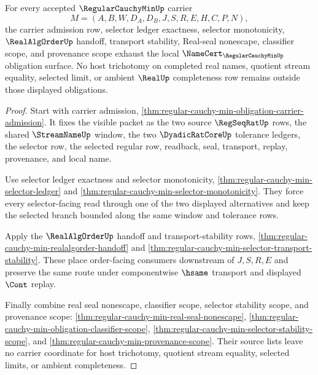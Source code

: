 \begin{theorem}
\label{thm:regular-cauchy-min-obligation-closure-route}
For every accepted $\RegularCauchyMinUp$ carrier
$$
M=(A,B,W,D_A,D_B,J,S,R,E,H,C,P,N),
$$
the carrier admission row, selector ledger exactness, selector monotonicity, $\RealAlgOrderUp$ handoff, transport stability, Real-seal nonescape, classifier scope, and provenance scope exhaust the local $\NameCert_{\RegularCauchyMinUp}$ obligation surface. No host trichotomy on completed real names, quotient stream equality, selected limit, or ambient $\RealUp$ completeness row remains outside those displayed obligations.
\end{theorem}
\begin{proof}
Start with carrier admission, \autoref{thm:regular-cauchy-min-obligation-carrier-admission}. It fixes the visible packet as the two source $\RegSeqRatUp$ rows, the shared $\StreamNameUp$ window, the two $\DyadicRatCoreUp$ tolerance ledgers, the selector row, the selected regular row, readback, seal, transport, replay, provenance, and local name.

Use selector ledger exactness and selector monotonicity, \autoref{thm:regular-cauchy-min-selector-ledger} and \autoref{thm:regular-cauchy-min-selector-monotonicity}. They force every selector-facing read through one of the two displayed alternatives and keep the selected branch bounded along the same window and tolerance rows.

Apply the $\RealAlgOrderUp$ handoff and transport-stability rows, \autoref{thm:regular-cauchy-min-realalgorder-handoff} and \autoref{thm:regular-cauchy-min-selector-transport-stability}. These place order-facing consumers downstream of $J,S,R,E$ and preserve the same route under componentwise $\hsame$ transport and displayed $\Cont$ replay.

Finally combine real seal nonescape, classifier scope, selector stability scope, and provenance scope: \autoref{thm:regular-cauchy-min-real-seal-nonescape}, \autoref{thm:regular-cauchy-min-obligation-classifier-scope}, \autoref{thm:regular-cauchy-min-selector-stability-scope}, and \autoref{thm:regular-cauchy-min-provenance-scope}. Their source lists leave no carrier coordinate for host trichotomy, quotient stream equality, selected limits, or ambient completeness.
\end{proof}

